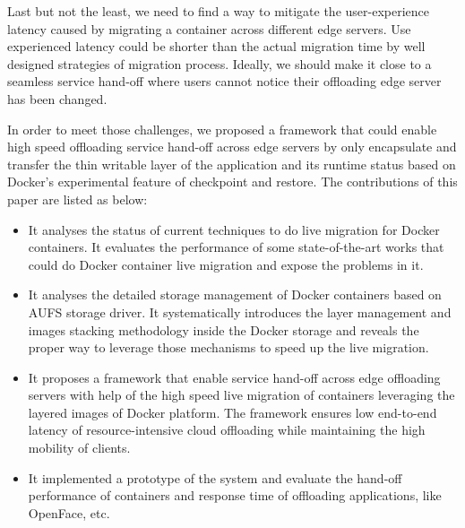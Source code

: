 Last but not the least, we need to find a way to mitigate the user-experience latency caused by migrating a container across different edge servers. Use experienced latency could be shorter than the actual migration time by well designed strategies of migration process. Ideally, we should make it close to a seamless service hand-off where users cannot notice their offloading edge server has been changed.

In order to meet those challenges, we proposed a framework that could enable high speed offloading service hand-off across edge servers by only encapsulate and transfer the thin writable layer of the application and its runtime status based on Docker's  experimental feature of checkpoint and restore. The contributions of this paper are listed as below:
\begin{itemize}
    \item It analyses the status of current techniques to do live migration for Docker containers. It evaluates the performance of some state-of-the-art works that could do Docker container live migration and expose the problems in it.
    
     \item It analyses the detailed storage management of Docker containers based on AUFS storage driver. It systematically introduces the layer management and images stacking methodology inside the Docker storage and reveals the proper way to leverage those mechanisms to speed up the live migration.
    
    
    \item It proposes a framework that enable service hand-off across edge offloading servers with help of the high speed live migration of containers leveraging the layered images of Docker platform. The framework ensures low end-to-end latency of resource-intensive cloud offloading while maintaining the high mobility of clients. 
    
    \item It implemented a prototype of the system and evaluate the hand-off performance of containers and response time of offloading applications, like OpenFace, etc. 
    
\end{itemize}